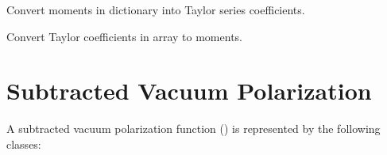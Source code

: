 \documentclass[letterpaper,10pt,english]{sphinxmanual}
\begin{document}

\begin{fulllineitems}
\label{\detokenize{g2tools:g2tools.mom2taylor}}
Convert moments in dictionary  into Taylor series coefficients.

\end{fulllineitems}


\begin{fulllineitems}
\label{\detokenize{g2tools:g2tools.taylor2mom}}
Convert Taylor coefficients in array  to moments.

\end{fulllineitems}



\section{Subtracted Vacuum Polarization}
\label{\detokenize{g2tools:subtracted-vacuum-polarization}}
A subtracted vacuum polarization function () is
represented by the following classes:
\end{document}

